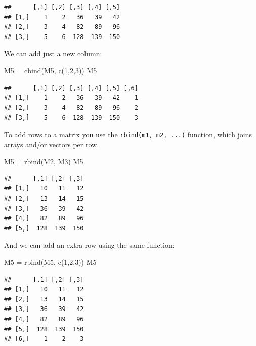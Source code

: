 \documentclass[
]{book}
\newenvironment{Shaded}{\begin{snugshade}}{\end{snugshade}}
\newcommand{\DecValTok}[1]{\textcolor[rgb]{0.00,0.00,0.81}{#1}}
\newcommand{\FunctionTok}[1]{\textcolor[rgb]{0.00,0.00,0.00}{#1}}
\newcommand{\NormalTok}[1]{#1}
\newcommand{\OtherTok}[1]{\textcolor[rgb]{0.56,0.35,0.01}{#1}}
\theoremstyle{definition}
\theoremstyle{definition}
\theoremstyle{definition}
\theoremstyle{definition}
\theoremstyle{remark}
\begin{document}
\begin{verbatim}
##      [,1] [,2] [,3] [,4] [,5]
## [1,]    1    2   36   39   42
## [2,]    3    4   82   89   96
## [3,]    5    6  128  139  150
\end{verbatim}

We can add just a new column:

\begin{Shaded}
\begin{Highlighting}[]
\NormalTok{M5 }\OtherTok{=} \FunctionTok{cbind}\NormalTok{(M5, }\FunctionTok{c}\NormalTok{(}\DecValTok{1}\NormalTok{,}\DecValTok{2}\NormalTok{,}\DecValTok{3}\NormalTok{))}
\NormalTok{M5}
\end{Highlighting}
\end{Shaded}

\begin{verbatim}
##      [,1] [,2] [,3] [,4] [,5] [,6]
## [1,]    1    2   36   39   42    1
## [2,]    3    4   82   89   96    2
## [3,]    5    6  128  139  150    3
\end{verbatim}

To add rows to a matrix you use the \texttt{rbind(m1,\ m2,\ ...)} function, which joins arrays and/or vectors per row.

\begin{Shaded}
\begin{Highlighting}[]
\NormalTok{M5 }\OtherTok{=} \FunctionTok{rbind}\NormalTok{(M2, M3)}
\NormalTok{M5}
\end{Highlighting}
\end{Shaded}

\begin{verbatim}
##      [,1] [,2] [,3]
## [1,]   10   11   12
## [2,]   13   14   15
## [3,]   36   39   42
## [4,]   82   89   96
## [5,]  128  139  150
\end{verbatim}

And we can add an extra row using the same function:

\begin{Shaded}
\begin{Highlighting}[]
\NormalTok{M5 }\OtherTok{=} \FunctionTok{rbind}\NormalTok{(M5, }\FunctionTok{c}\NormalTok{(}\DecValTok{1}\NormalTok{,}\DecValTok{2}\NormalTok{,}\DecValTok{3}\NormalTok{))}
\NormalTok{M5}
\end{Highlighting}
\end{Shaded}

\begin{verbatim}
##      [,1] [,2] [,3]
## [1,]   10   11   12
## [2,]   13   14   15
## [3,]   36   39   42
## [4,]   82   89   96
## [5,]  128  139  150
## [6,]    1    2    3
\end{verbatim}
\end{document}
